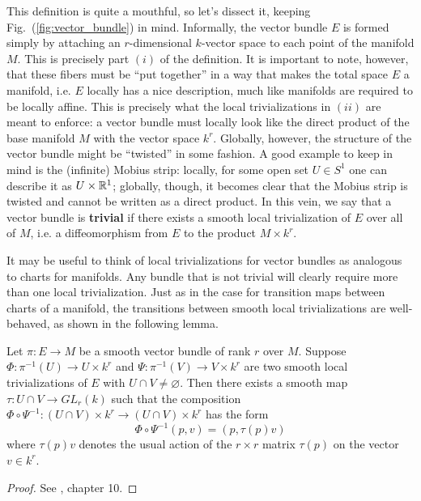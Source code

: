 \documentclass{../../mathnotes}
\begin{document}
This definition is quite a mouthful, so let's dissect it, keeping Fig.~(\ref{fig:vector_bundle}) in mind.
Informally, the vector bundle $E$ is formed simply by attaching an $r$-dimensional $k$-vector space to each point of the manifold $M$.
This is precisely part $(i)$ of the definition. It is important to note, however, that these fibers must be ``put together'' in a way
that makes the total space $E$ a manifold, i.e. $E$ locally has a nice description, much like manifolds are required to be locally affine.
This is precisely what the local trivializations in $(ii)$ are meant to enforce: a vector bundle must locally look like the direct product of
the base manifold $M$ with the vector space $k^r$. Globally, however, the structure of the vector bundle might be ``twisted'' in some fashion.
A good example to keep in mind is the (infinite) Mobius strip: locally, for some open set $U\in S^1$ one can describe it as $U\times\mathbb{R}^1$;
globally, though, it becomes clear that the Mobius strip is twisted and cannot be written as a direct product. In this vein,
we say that a vector bundle is \textbf{trivial} if there exists a smooth local trivialization of $E$ over all of $M$, i.e. a diffeomorphism from $E$
to the product $M\times k^r$.

It may be useful to think of local trivializations for vector bundles as analogous to charts for manifolds. Any bundle that is not trivial
will clearly require more than one local trivialization. Just as in the case for transition maps between charts of a manifold, the transitions
between smooth local trivializations are well-behaved, as shown in the following lemma.

\begin{lem}
    Let $\pi:E\to M$ be a smooth vector bundle of rank $r$ over $M$. Suppose $\Phi:\pi^{-1}(U)\to U\times k^r$ and $\Psi:\pi^{-1}(V)\to V\times k^r$
    are two smooth local trivializations of $E$ with $U\cap V\neq\varnothing$. Then there exists a smooth map $\tau:U\cap V\to GL_r(k)$
    such that the composition $\Phi\circ\Psi^{-1}:(U\cap V)\times k^r\to (U\cap V)\times k^r$ has the form
    \[\Phi\circ\Psi^{-1}(p,v)=\left( p,\tau(p)v \right)\]
    where $\tau(p)v$ denotes the usual action of the $r\times r$ matrix $\tau(p)$ on the vector $v\in k^r$.
\end{lem}
\begin{proof}
    See \cite{lee12}, chapter 10.
\end{proof}
\end{document}
